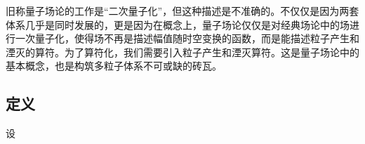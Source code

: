 \begin{issues}
\issueDraft
\end{issues}
旧称量子场论的工作是“二次量子化”，但这种描述是不准确的。不仅仅是因为两套体系几乎是同时发展的，更是因为在概念上，量子场论仅仅是对经典场论中的场进行一次量子化，使得场不再是描述幅值随时空变换的函数，而是能描述粒子产生和湮灭的算符。为了算符化，我们需要引入粒子产生和湮灭算符。这是量子场论中的基本概念，也是构筑多粒子体系不可或缺的砖瓦。


\subsection{定义}
设

